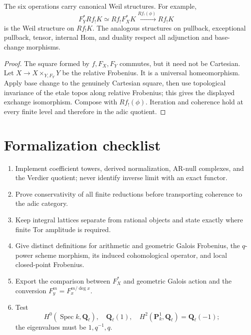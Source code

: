 \begin{proposition}
\label{prop:weil-six-ops}
The six operations carry canonical Weil structures.  For example,
\[
 F_Y^*Rf_!K\simeq Rf_!F_X^*K
 \xrightarrow{Rf_!(\phi)}Rf_!K
\]
is the Weil structure on \(Rf_!K\).  The analogous structures on pullback,
exceptional pullback, tensor, internal Hom, and duality respect all adjunction
and base-change morphisms.
\end{proposition}

\begin{proof}
The square formed by \(f,F_X,F_Y\) commutes, but it need not be Cartesian.
Let \(X\to X\times_{Y,F_Y}Y\) be the relative Frobenius.  It is a
universal homeomorphism.  Apply base change to the genuinely Cartesian
square, then use topological invariance of the etale topos along relative
Frobenius; this gives the displayed exchange isomorphism.  Compose with
\(Rf_!(\phi)\).  Iteration and coherence hold at every finite level and
therefore in the adic quotient.
\end{proof}

\section{Formalization checklist}

\begin{enumerate}
\item Implement coefficient towers, derived normalization, AR-null complexes,
and the Verdier quotient; never identify inverse limit with an exact functor.
\item Prove conservativity of all finite reductions before transporting
coherence to the adic category.
\item Keep integral lattices separate from rational objects and state exactly
where finite Tor amplitude is required.
\item Give distinct definitions for arithmetic and geometric Galois
Frobenius, the \(q\)-power scheme morphism, its induced cohomological operator,
and local closed-point Frobenius.
\item Export the comparison between \(F_X^*\) and geometric Galois action and
the conversion \(F_y^m=F_x^{m/\deg x}\).
\item Test
\[
 H^0(\operatorname{Spec}k,\mathbf Q_\ell),\quad
 \mathbf Q_\ell(1),\quad
 H^2(\mathbf P^1_k,\mathbf Q_\ell)=\mathbf Q_\ell(-1);
\]
the eigenvalues must be \(1,q^{-1},q\).
\end{enumerate}


